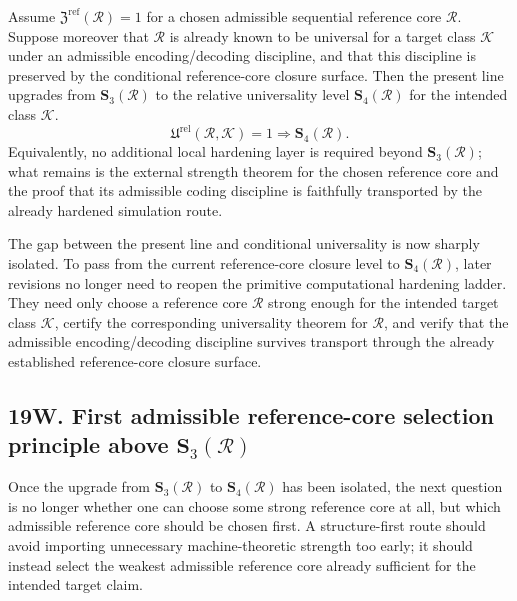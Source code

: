 \begin{proposition}
Assume \(\mathfrak Z^{\mathrm{ref}}(\mathcal R)=1\) for a chosen admissible sequential reference core \(\mathcal R\). Suppose moreover that \(\mathcal R\) is already known to be universal for a target class \(\mathcal K\) under an admissible encoding/decoding discipline, and that this discipline is preserved by the conditional reference-core closure surface. Then the present line upgrades from \(\mathbf S_3(\mathcal R)\) to the relative universality level \(\mathbf S_4(\mathcal R)\) for the intended class \(\mathcal K\).
\[
\mathfrak U^{\mathrm{rel}}(\mathcal R,\mathcal K)=1
\Longrightarrow
\mathbf S_4(\mathcal R).
\]
Equivalently, no additional local hardening layer is required beyond \(\mathbf S_3(\mathcal R)\); what remains is the external strength theorem for the chosen reference core and the proof that its admissible coding discipline is faithfully transported by the already hardened simulation route.
\end{proposition}

\begin{corollary}
The gap between the present line and conditional universality is now sharply isolated. To pass from the current reference-core closure level to \(\mathbf S_4(\mathcal R)\), later revisions no longer need to reopen the primitive computational hardening ladder. They need only choose a reference core \(\mathcal R\) strong enough for the intended target class \(\mathcal K\), certify the corresponding universality theorem for \(\mathcal R\), and verify that the admissible encoding/decoding discipline survives transport through the already established reference-core closure surface.
\end{corollary}


\subsection*{19W. First admissible reference-core selection principle above \(\mathbf S_3(\mathcal R)\)}
Once the upgrade from \(\mathbf S_3(\mathcal R)\) to \(\mathbf S_4(\mathcal R)\) has been isolated, the next question is no longer whether one can choose some strong reference core at all, but which admissible reference core should be chosen first. A structure-first route should avoid importing unnecessary machine-theoretic strength too early; it should instead select the weakest admissible reference core already sufficient for the intended target claim.

